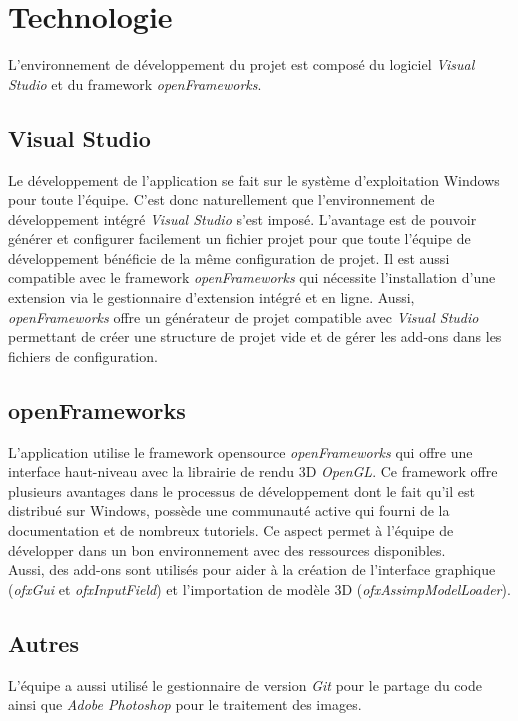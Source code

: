 \section{Technologie}
\label{s:technologie}
L'environnement de développement du projet est composé du logiciel \textit{Visual Studio} et du framework \textit{openFrameworks}.
\subsection{Visual Studio}
Le développement de l'application se fait sur le système d'exploitation Windows pour toute l'équipe.
C'est donc naturellement que l'environnement de développement intégré \textit{Visual Studio} s'est imposé.
L'avantage est de pouvoir générer et configurer facilement un fichier projet pour que toute l'équipe de développement bénéficie de la même configuration de projet.
Il est aussi compatible avec le framework \textit{openFrameworks} qui nécessite l'installation d'une extension via le gestionnaire d'extension intégré et en ligne.
Aussi, \textit{openFrameworks} offre un générateur de projet compatible avec \textit{Visual Studio} permettant de créer une structure de projet vide et de gérer les add-ons dans les fichiers de configuration.

\subsection{openFrameworks}
L'application utilise le framework opensource \textit{openFrameworks} qui offre une interface haut-niveau avec la librairie de rendu 3D \textit{OpenGL}.
Ce framework offre plusieurs avantages dans le processus de développement dont le fait qu'il est distribué sur Windows, possède une communauté active qui fourni de la documentation et de nombreux tutoriels.
Ce aspect permet à l'équipe de développer dans un bon environnement avec des ressources disponibles. \\
\newline
Aussi, des add-ons sont utilisés pour aider à la création de l'interface graphique (\textit{ofxGui} et \textit{ofxInputField}) et l'importation de modèle 3D (\textit{ofxAssimpModelLoader}).

\subsection{Autres}
L'équipe a aussi utilisé le gestionnaire de version \textit{Git} pour le partage du code ainsi que \textit{Adobe Photoshop} pour le traitement des images. 